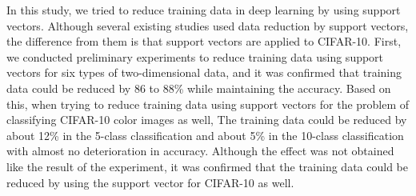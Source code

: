 In this study, we tried to reduce training data in deep learning by using support vectors. Although several existing studies used data reduction by support vectors, the difference from them is that support vectors are applied to CIFAR-10. First, we conducted preliminary experiments to reduce training data using support vectors for six types of two-dimensional data, and it was confirmed that training data could be reduced by 86 to 88\% while maintaining the accuracy. Based on this, when trying to reduce training data using support vectors for the problem of classifying CIFAR-10 color images as well, The training data could be reduced by about 12\% in the 5-class classification and about 5\% in the 10-class classification with almost no deterioration in accuracy. Although the effect was not obtained like the result of the experiment, it was confirmed that the training data could be reduced by using the support vector for CIFAR-10 as well.